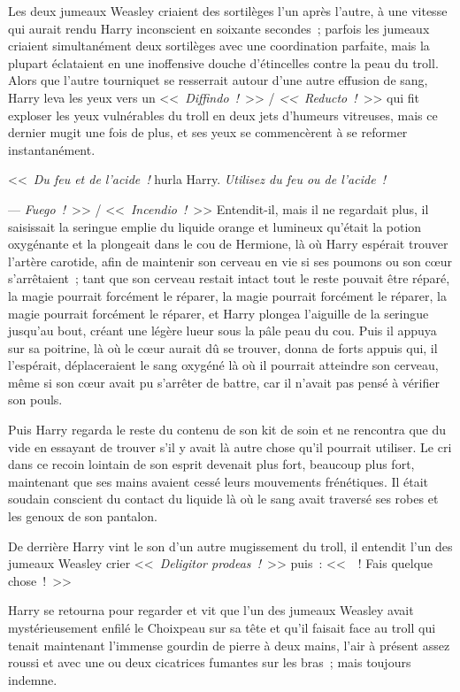 Les deux jumeaux Weasley criaient des sortilèges l'un après l'autre, à une vitesse qui aurait rendu Harry inconscient en soixante secondes~; parfois les jumeaux criaient simultanément deux sortilèges avec une coordination parfaite, mais la plupart éclataient en une inoffensive douche d'étincelles contre la peau du troll. Alors que l'autre tourniquet se resserrait autour d'une autre effusion de sang, Harry leva les yeux vers un <<~\emph{Diffindo~!}~>> / \emph{<<~Reducto~!}~>> qui fit exploser les yeux vulnérables du troll en deux jets d'humeurs vitreuses, mais ce dernier mugit une fois de plus, et ses yeux se commencèrent à se reformer instantanément.

<<~\emph{Du feu et de l'acide~!} hurla Harry. \emph{Utilisez du feu ou de l'acide~!}

--- \emph{Fuego~!}~>> / <<~\emph{Incendio~!}~>> Entendit-il, mais il ne regardait plus, il saisissait la seringue emplie du liquide orange et lumineux qu'était la potion oxygénante et la plongeait dans le cou de Hermione, là où Harry espérait trouver l'artère carotide, afin de maintenir son cerveau en vie si ses poumons ou son cœur s'arrêtaient~; tant que son cerveau restait intact tout le reste pouvait être réparé, la magie pourrait forcément le réparer, la magie pourrait forcément le réparer, la magie pourrait forcément le réparer, et Harry plongea l'aiguille de la seringue jusqu'au bout, créant une légère lueur sous la pâle peau du cou. Puis il appuya sur sa poitrine, là où le cœur aurait dû se trouver, donna de forts appuis qui, il l'espérait, déplaceraient le sang oxygéné là où il pourrait atteindre son cerveau, même si son cœur avait pu s'arrêter de battre, car il n'avait pas pensé à vérifier son pouls.

Puis Harry regarda le reste du contenu de son kit de soin et ne rencontra que du vide en essayant de trouver s'il y avait là autre chose qu'il pourrait utiliser. Le cri dans ce recoin lointain de son esprit devenait plus fort, beaucoup plus fort, maintenant que ses mains avaient cessé leurs mouvements frénétiques. Il était soudain conscient du contact du liquide là où le sang avait traversé ses robes et les genoux de son pantalon.

De derrière Harry vint le son d'un autre mugissement du troll, il entendit l'un des jumeaux Weasley crier <<~\emph{Deligitor prodeas~!}~>> puis~: <<~~! Fais quelque chose~!~>>

Harry se retourna pour regarder et vit que l'un des jumeaux Weasley avait mystérieusement enfilé le Choixpeau sur sa tête et qu'il faisait face au troll qui tenait maintenant l'immense gourdin de pierre à deux mains, l'air à présent assez roussi et avec une ou deux cicatrices fumantes sur les bras~; mais toujours indemne.

